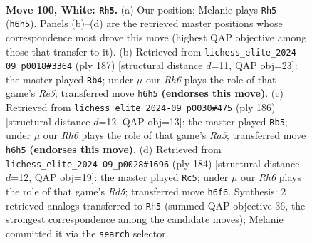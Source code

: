 \documentclass[11pt]{article}
\begin{document}
\clearpage

\begin{figure}[p]\centering
\begin{subfigure}{0.46\textwidth}\centering
\resizebox{\linewidth}{!}{%
\newchessgame
\chessboard[
  setfen={8/3k4/4p2R/8/1R2P3/5PK1/8/r7 w - - 3 100},
  showmover=false,
  pgfstyle=straightmove, color=movearrow, markmove={h6-h5}
]}
\caption{}
\end{subfigure}\hfill
\begin{subfigure}{0.46\textwidth}\centering
\resizebox{\linewidth}{!}{%
\newchessgame
\chessboard[
  setfen={8/6k1/6p1/7p/4r2P/7R/8/5K2 b - - 49 94},
  showmover=false,
  pgfstyle=straightmove, color=movearrow, markmove={e4-b4}
]}
\caption{}
\end{subfigure}
\\[4pt]
\begin{subfigure}{0.46\textwidth}\centering
\resizebox{\linewidth}{!}{%
\newchessgame
\chessboard[
  setfen={8/8/7k/R6p/7P/6PK/8/2r5 w - - 33 94},
  showmover=false,
  pgfstyle=straightmove, color=movearrow, markmove={a5-b5}
]}
\caption{}
\end{subfigure}\hfill
\begin{subfigure}{0.46\textwidth}\centering
\resizebox{\linewidth}{!}{%
\newchessgame
\chessboard[
  setfen={8/8/7k/3R3p/7P/6PK/8/1r6 w - - 62 93},
  showmover=false,
  pgfstyle=straightmove, color=movearrow, markmove={d5-c5}
]}
\caption{}
\end{subfigure}
\caption{\textbf{Move 100, White: \texttt{Rh5}.} (a) Our position; Melanie plays \texttt{Rh5} (\texttt{h6h5}). Panels (b)--(d) are the retrieved master positions whose correspondence most drove this move (highest QAP objective among those that transfer to it). (b) Retrieved from \texttt{lichess\_elite\_2024-09\_p0018\#3364} (ply 187) [structural distance $d$=11, QAP obj=23]: the master played \texttt{Rb4}; under $\mu$ our \emph{Rh6} plays the role of that game's \emph{Re5}; transferred move \texttt{h6h5} \textbf{(endorses this move)}. (c) Retrieved from \texttt{lichess\_elite\_2024-09\_p0030\#475} (ply 186) [structural distance $d$=12, QAP obj=13]: the master played \texttt{Rb5}; under $\mu$ our \emph{Rh6} plays the role of that game's \emph{Ra5}; transferred move \texttt{h6h5} \textbf{(endorses this move)}. (d) Retrieved from \texttt{lichess\_elite\_2024-09\_p0028\#1696} (ply 184) [structural distance $d$=12, QAP obj=19]: the master played \texttt{Rc5}; under $\mu$ our \emph{Rh6} plays the role of that game's \emph{Rd5}; transferred move \texttt{h6f6}. Synthesis: 2 retrieved analogs transferred to \texttt{Rh5} (summed QAP objective 36, the strongest correspondence among the candidate moves); Melanie committed it via the \texttt{search} selector.}
\label{fig:thought-m198}
\end{figure}
\end{document}
